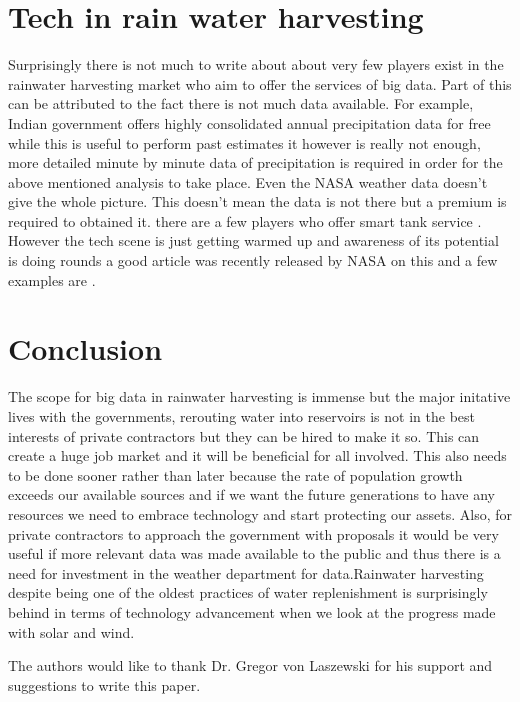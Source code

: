 \documentclass[sigconf]{acmart}
\begin{document}
\section{Tech in rain water harvesting}
Surprisingly there is not much to write about about very few players exist in the rainwater harvesting market who aim to offer the services of big data. Part of this can be attributed to the fact there is not much data available. For example, Indian government offers highly consolidated annual precipitation data for free while this is useful to perform past estimates it however is really not enough, more detailed minute by minute data of precipitation is required in order for the above mentioned analysis to take place. Even the NASA weather data doesn't give the whole picture. This doesn't mean the data is not there but a premium is required to obtained it. there are a few players who offer smart tank service . However the tech scene is just getting  warmed up and awareness of its potential is doing rounds a good article was recently released by NASA on this \cite{Morrow2015} and a few examples are \cite{UNEP2017}.

\section{Conclusion}

The scope for big data in rainwater harvesting is immense but the major initative lives with the governments, rerouting water into reservoirs is not in the best interests of private contractors but they can be hired to make it so. This can create a huge job market and it will be beneficial for all involved. This also needs to be done sooner rather than later because the rate of population growth exceeds our available sources and if we want the future generations to have any resources we need to embrace technology and start protecting our assets. Also, for private contractors to approach the government with proposals it would be very useful if more relevant data was made available to the public and thus there is a need for investment in the weather department for data.Rainwater harvesting despite being one of the oldest practices of water replenishment is surprisingly behind in terms of technology advancement when we look at the progress made with solar and wind.


\begin{acks}

  The authors would like to thank Dr. Gregor von Laszewski for his support and suggestions to write this paper.

\end{acks}


 

\appendix


\end{document}
